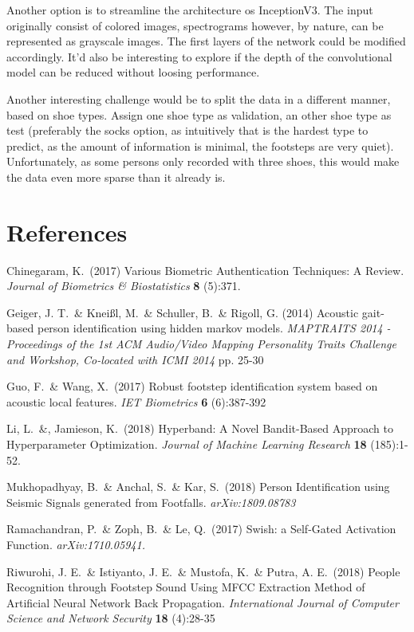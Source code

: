 \documentclass{article}
\begin{document}
Another option is to streamline the architecture os InceptionV3. The input originally consist of colored images, spectrograms however, by nature, can be represented as grayscale images. The first layers of the network could be modified accordingly. It'd also be interesting to explore if the depth of the convolutional model can be reduced without loosing performance.

Another interesting challenge would be to split the data in a different manner, based on shoe types. Assign one shoe type as validation, an other shoe type as test (preferably the socks option, as intuitively that is the hardest type to predict, as the amount of information is minimal, the footsteps are very quiet). Unfortunately, as some persons only recorded with three shoes, this would make the data even more sparse than it already is.

\section*{References}

\small

Chinegaram, K.\ (2017) Various Biometric Authentication Techniques: A Review. {\it Journal of Biometrics \& Biostatistics} {\bf 8} (5):371.

Geiger, J. T.\ \& Kneißl, M.\ \& Schuller, B.\ \& Rigoll, G. (2014) Acoustic gait-based person identification using hidden markov models. {\it MAPTRAITS 2014 - Proceedings of the 1st ACM Audio/Video Mapping Personality Traits Challenge and Workshop, Co-located with ICMI 2014} pp. 25-30

Guo, F.\ \& Wang, X.\ (2017) Robust footstep identification system based on acoustic local features. {\it IET Biometrics} {\bf 6} (6):387-392

Li, L.\ \&, Jamieson, K.\ (2018) Hyperband: A Novel Bandit-Based Approach to Hyperparameter Optimization.  {\it Journal of Machine Learning Research} {\bf 18} (185):1-52.

Mukhopadhyay, B.\ \& Anchal, S.\ \& Kar, S.\ (2018) Person Identification using Seismic Signals generated from Footfalls. {\it arXiv:1809.08783}

Ramachandran, P.\ \& Zoph, B.\ \& Le, Q.\ (2017) Swish: a Self-Gated Activation Function. {\it arXiv:1710.05941.}

Riwurohi, J. E.\ \& Istiyanto, J. E.\ \& Mustofa, K.\ \& Putra, A. E.\ (2018) People Recognition through Footstep Sound Using MFCC Extraction Method of Artificial Neural Network Back Propagation. {\it International Journal of Computer Science and Network Security} {\bf 18} (4):28-35
\end{document}
